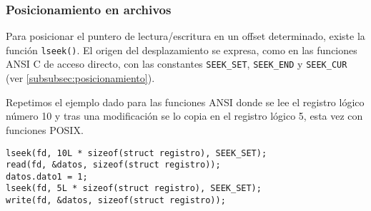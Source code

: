 \subsubsection{Posicionamiento en archivos}
Para posicionar el puntero de lectura/escritura en un offset determinado,
existe la función \lstinline{lseek()}. El origen del desplazamiento se expresa, como en las
funciones ANSI C de acceso directo, con las constantes \lstinline{SEEK_SET}, \lstinline{SEEK_END} y
\lstinline{SEEK_CUR} (ver \ref{subsubsec:posicionamiento}).

\begin{ejemplo}
Repetimos el ejemplo dado para las funciones ANSI donde se lee el registro
lógico número 10 y tras una modificación se lo copia en el registro lógico 5,
esta vez con funciones POSIX.
\begin{lstlisting}
lseek(fd, 10L * sizeof(struct registro), SEEK_SET);
read(fd, &datos, sizeof(struct registro));
datos.dato1 = 1;
lseek(fd, 5L * sizeof(struct registro), SEEK_SET);
write(fd, &datos, sizeof(struct registro));
\end{lstlisting}
\end{ejemplo}



